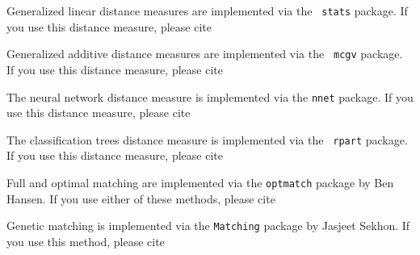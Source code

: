 Generalized linear distance measures are implemented via the {\tt
stats} package.  If you use this distance measure, please cite 
\begin{verse}
\end{verse}

Generalized additive distance measures are implemented via the {\tt
  mcgv} package.  If you use this distance measure, please cite
\begin{verse}
\end{verse}  

The neural network distance measure is implemented via the {\tt nnet}
package.  If you use this distance measure, please cite
\begin{verse}
\end{verse}

The classification trees distance measure is implemented via the {\tt
  rpart} package.  If you use this distance measure, please cite
\begin{verse}
\end{verse}  

Full and optimal matching are implemented via the {\tt optmatch}
package by Ben Hansen. If you use either of these methods, please cite
\begin{verse}
\end{verse} 

Genetic matching is implemented via the {\tt Matching} package by
Jasjeet Sekhon.  If you use this method, please cite
\begin{verse}
\end{verse}

